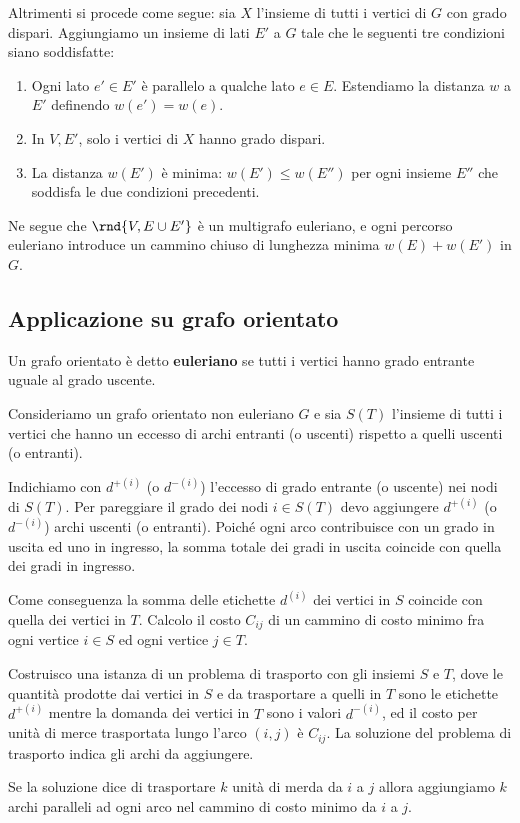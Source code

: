 \documentclass[\main/main.tex]{subfiles}
\begin{document}
Altrimenti si procede come segue: sia \(X\) l'insieme di tutti i vertici di \(G\) con grado dispari. Aggiungiamo un insieme di lati \(E'\) a \(G\) tale che le seguenti tre condizioni siano soddisfatte:
\begin{enumerate}
	\item Ogni lato \(e' \in E'\) è parallelo a qualche lato \(e \in E\). Estendiamo la distanza \(w\) a \(E'\) definendo \(w(e') = w(e)\).
	\item In \(V, E'\), solo i vertici di \(X\) hanno grado dispari.
	\item La distanza \(w(E')\) è minima: \(w(E') \leq w(E'')\) per ogni insieme \(E''\) che soddisfa le due condizioni precedenti.
\end{enumerate}
Ne segue che \(\rnd{V, E \cup E'}\) è un multigrafo euleriano, e ogni percorso euleriano introduce un cammino chiuso di lunghezza minima \(w(E) + w(E')\) in \(G\).

\subsection{Applicazione su grafo orientato}
\begin{definition}
	Un grafo orientato è detto \textbf{euleriano} se tutti i vertici hanno grado entrante uguale al grado uscente.
\end{definition}
Consideriamo un grafo orientato non euleriano \(G\) e sia \(S(T)\) l'insieme di tutti i vertici che hanno un eccesso di archi entranti (o uscenti) rispetto a quelli uscenti (o entranti).

Indichiamo con \(d^{+(i)}\) (o \(d^{-(i)}\)) l'eccesso di grado entrante (o uscente) nei nodi di \(S(T)\). Per pareggiare il grado dei nodi \(i \in S(T)\) devo aggiungere \(d^{+(i)}\) (o \(d^{-(i)}\)) archi uscenti (o entranti). Poiché ogni arco contribuisce con un grado in uscita ed uno in ingresso, la somma totale dei gradi in uscita coincide con quella dei gradi in ingresso.

Come conseguenza la somma delle etichette \(d^{(i)}\) dei vertici in \(S\) coincide con quella dei vertici in \(T\). Calcolo il costo \(C_{ij}\) di un cammino di costo minimo fra ogni vertice \(i \in S\) ed ogni vertice \(j \in T\).

Costruisco una istanza di un problema di trasporto con gli insiemi \(S\) e \(T\), dove le quantità prodotte dai vertici in \(S\) e da trasportare a quelli in \(T\) sono le etichette \(d^{+(i)}\) mentre la domanda dei vertici in \(T\) sono i valori \(d^{-(i)}\), ed il costo per unità di merce trasportata lungo l'arco \((i,j)\) è \(C_{ij}\). La soluzione del problema di trasporto indica gli archi da aggiungere.

Se la soluzione dice di trasportare \(k\) unità di merda da \(i\) a \(j\) allora aggiungiamo \(k\) archi paralleli ad ogni arco nel cammino di costo minimo da \(i\) a \(j\).
\end{document}
